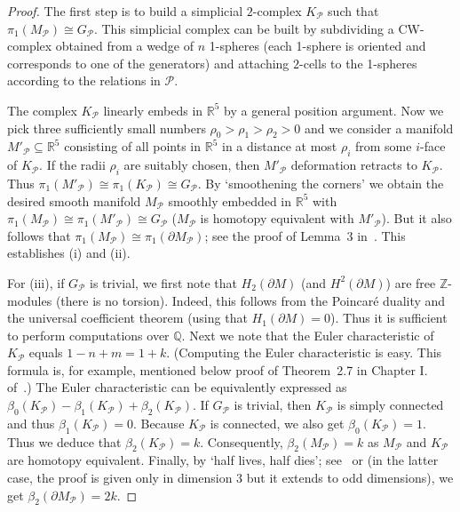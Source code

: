 \documentclass[10pt,a4paper]{article}
\theoremstyle{definition}
\theoremstyle{remark}
\newcommand{\R}{{\mathbb{R}}}
\newcommand{\Q}{{\mathbb{Q}}}
\newcommand{\Z}{{\mathbb{Z}}}
\newcommand\PP{\mathcal{P}}
\begin{document}
\begin{proof}
  The first step is to build a simplicial $2$-complex $K_{\PP}$ such that
  $\pi_1(M_{\PP}) \cong G_{\PP}$. This simplicial complex can be built by
  subdividing
  a CW-complex obtained from a wedge of $n$ 1-spheres (each 1-sphere is
  oriented and corresponds to one of the generators) and attaching $2$-cells to
  the 1-spheres according to the relations in $\PP$. 

  The complex $K_{\PP}$ linearly embeds in $\R^5$ by a general position argument.
  Now we pick three sufficiently small numbers $\rho_0 > \rho_1 > \rho_2 > 0$
  and we consider a manifold $M'_{\PP} \subseteq \R^5$ consisting of all points in
  $\R^5$ in a distance at most $\rho_i$ from some $i$-face of $K_{\PP}$. If the
  radii $\rho_i$ are suitably chosen, then $M'_{\PP}$ deformation retracts to
  $K_{\PP}$. Thus $\pi_1(M'_{\PP}) \cong \pi_1(K_{\PP}) \cong G_{\PP}$. By `smoothening the
  corners' we obtain the desired smooth manifold $M_{\PP}$ smoothly embedded in
  $\R^5$ with $\pi_1(M_{\PP}) \cong \pi_1(M'_{\PP}) \cong G_{\PP}$ ($M_{\PP}$ is homotopy
  equivalent with $M'_{\PP}$). But it also follows
  that $\pi_1(M_{\PP}) \cong \pi_1(\partial M_{\PP})$; see the proof of Lemma~3
  in~\cite{kirby20}. This establishes (i) and (ii).

  For (iii), if $G_\PP$ is trivial, we first note that $H_2(\partial M)$ (and
  $H^2(\partial M)$) are free $\Z$-modules (there is no torsion). Indeed, this
  follows from the Poincaré duality and the universal coefficient theorem
  (using that $H_1(\partial M) = 0$). Thus it is sufficient to perform
  computations over $\Q$.
  Next we 
  note that the Euler characteristic of $K_{\PP}$ equals $1 - n + m =
  1 + k$. (Computing the Euler characteristic is easy. This formula is, for
  example, mentioned below proof of Theorem~2.7 in Chapter I.
  of~\cite{hog-angeloni-metzler-sieradski93}.)  The Euler characteristic can be
  equivalently expressed as $\beta_0(K_{\PP}) - \beta_1(K_{\PP}) +
  \beta_2(K_{\PP})$. If
  $G_{\PP}$ is trivial, then $K_{\PP}$ is simply connected and thus
  $\beta_1(K_{\PP}) = 0$.
  Because $K_{\PP}$ is connected, we also get $\beta_0(K_{\PP}) = 1$. Thus we deduce
  that $\beta_2(K_{\PP}) = k$. Consequently, $\beta_2(M_{\PP}) = k$ as
  $M_{\PP}$ and $K_{\PP}$
  are homotopy equivalent. Finally, by `half lives, half dies';
  see~\cite{putman22} or \cite[Lemma 3.5]{hatcher07} (in the latter case, the
  proof is given only in dimension 3 but it extends to odd dimensions), we
  get $\beta_2(\partial M_{\PP}) = 2k$. 
\end{proof}
\end{document}
